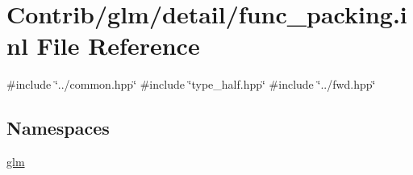 \hypertarget{func__packing_8inl}{}\section{Contrib/glm/detail/func\+\_\+packing.inl File Reference}
\label{func__packing_8inl}
{\ttfamily \#include \char`\"{}../common.\+hpp\char`\"{}}\newline
{\ttfamily \#include \char`\"{}type\+\_\+half.\+hpp\char`\"{}}\newline
{\ttfamily \#include \char`\"{}../fwd.\+hpp\char`\"{}}\newline
\subsection*{Namespaces}
\begin{DoxyCompactItemize}
\item 
 \mbox{\hyperlink{namespaceglm}{glm}}
\end{DoxyCompactItemize}
